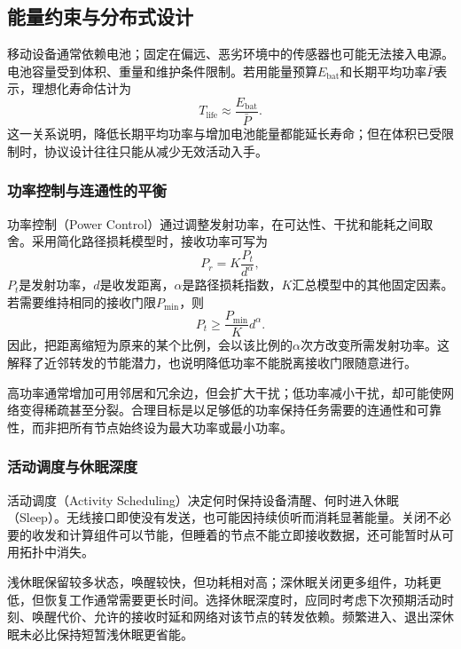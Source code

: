 \subsection{能量约束与分布式设计}

移动设备通常依赖电池；固定在偏远、恶劣环境中的传感器也可能无法接入电源。电池容量受到体积、重量和维护条件限制。若用能量预算$E_{\mathrm{bat}}$和长期平均功率$\bar P$表示，理想化寿命估计为
\begin{equation}
 T_{\mathrm{life}}\approx\frac{E_{\mathrm{bat}}}{\bar P}.
\end{equation}
这一关系说明，降低长期平均功率与增加电池能量都能延长寿命；但在体积已受限制时，协议设计往往只能从减少无效活动入手。

\subsubsection{功率控制与连通性的平衡}

功率控制（Power Control）通过调整发射功率，在可达性、干扰和能耗之间取舍。采用简化路径损耗模型时，接收功率可写为
\begin{equation}
 P_r=K\frac{P_t}{d^{\alpha}},
\end{equation}
$P_t$是发射功率，$d$是收发距离，$\alpha$是路径损耗指数，$K$汇总模型中的其他固定因素。若需要维持相同的接收门限$P_{\min}$，则
\begin{equation}
 P_t\geq\frac{P_{\min}}{K}d^{\alpha}.
\end{equation}
因此，把距离缩短为原来的某个比例，会以该比例的$\alpha$次方改变所需发射功率。这解释了近邻转发的节能潜力，也说明降低功率不能脱离接收门限随意进行。

高功率通常增加可用邻居和冗余边，但会扩大干扰；低功率减小干扰，却可能使网络变得稀疏甚至分裂。合理目标是以足够低的功率保持任务需要的连通性和可靠性，而非把所有节点始终设为最大功率或最小功率。

\subsubsection{活动调度与休眠深度}

活动调度（Activity Scheduling）决定何时保持设备清醒、何时进入休眠（Sleep）。无线接口即使没有发送，也可能因持续侦听而消耗显著能量。关闭不必要的收发和计算组件可以节能，但睡着的节点不能立即接收数据，还可能暂时从可用拓扑中消失。

浅休眠保留较多状态，唤醒较快，但功耗相对高；深休眠关闭更多组件，功耗更低，但恢复工作通常需要更长时间。选择休眠深度时，应同时考虑下次预期活动时刻、唤醒代价、允许的接收时延和网络对该节点的转发依赖。频繁进入、退出深休眠未必比保持短暂浅休眠更省能。

